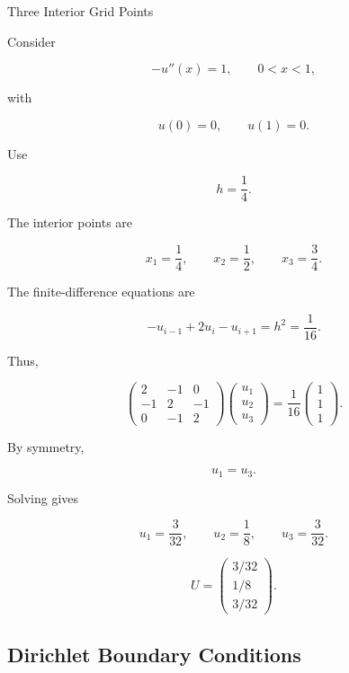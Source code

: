 \begin{workedexamplebox}{Three Interior Grid Points}

Consider

\[
-u''(x)=1,
\qquad
0<x<1,
\]

with

\[
u(0)=0,
\qquad
u(1)=0.
\]

Use

\[
h=\frac14.
\]

The interior points are

\[
x_1=\frac14,
\qquad
x_2=\frac12,
\qquad
x_3=\frac34.
\]

The finite-difference equations are

\[
-u_{i-1}+2u_i-u_{i+1}
=
h^2
=
\frac1{16}.
\]

Thus,

\[
\begin{pmatrix}
2&-1&0\\
-1&2&-1\\
0&-1&2
\end{pmatrix}
\begin{pmatrix}
u_1\\
u_2\\
u_3
\end{pmatrix}
=
\frac1{16}
\begin{pmatrix}
1\\
1\\
1
\end{pmatrix}.
\]

By symmetry,

\[
u_1=u_3.
\]

Solving gives

\[
u_1=\frac{3}{32},
\qquad
u_2=\frac18,
\qquad
u_3=\frac{3}{32}.
\]

\begin{answerbox}
\[
\boxed{
U
=
\begin{pmatrix}
3/32\\
1/8\\
3/32
\end{pmatrix}.
}
\]
\end{answerbox}

\end{workedexamplebox}

\subsection{Dirichlet Boundary Conditions}
\label{subsec:dirichlet-boundary-numerical}

